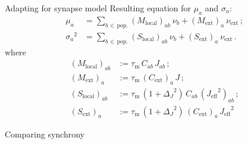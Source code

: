 \documentclass[xcolor=x11names,compress]{beamer}
\renewcommand{\(}{\begin{columns}}
\renewcommand{\)}{\end{columns}}
\newcommand{\<}[1]{\begin{column}{#1}}
\renewcommand{\>}{\end{column}}
\begin{document}
\begin{frame}[t]{Adapting for synapse model}
Resulting equation for $\mu_a$ and $\sigma_a$:
\begin{align*}
    \mu_a        &= 
        \sum_{b \,\in \,\text{pop.}}  (M_\text{local})_{ab} \: \nu_b 
        + (M_\text{ext})_{a} \: \nu_\text{ext} \, ; \\
    {\sigma_a}^2 &= 
        \sum_{b \,\in \,\text{pop.}} (S_\text{local})_{ab} \: \nu_b
        + (S_\text{ext})_{a}  \:\nu_\text{ext}\,.
\end{align*}
where
\begin{align*}
    (M_\text{local})_{ab} 
        &:= \tau_\text{m} \, C_{ab} \,J_{ab} \,;\\ 
    (M_\text{ext})_{a} 
        &:= \tau_\text{m} \, (C_\text{ext})_a \,J \,;\\
    (S_\text{local})_{ab} 
        &:= \tau_\text{m} \,(1 + {\Delta_J}^2) \,C_{ab} \,({J_\text{eff}}^2)_{ab} \,;\\
    (S_\text{ext})_{a} 
        &:= \tau_\text{m} \,(1 + {\Delta_J}^2) \,(C_\text{ext})_a \,{J_\text{eff}}^2 
\end{align*}
\end{frame}

\begin{frame}[t]{Comparing synchrony}
    \begin{columns}[T] %
    \begin{column}[T]{5.5cm} %
    \end{column}
    \begin{column}[T]{4.5cm} %
    \end{column}
    \end{columns}
\end{frame}


    
\end{document}
